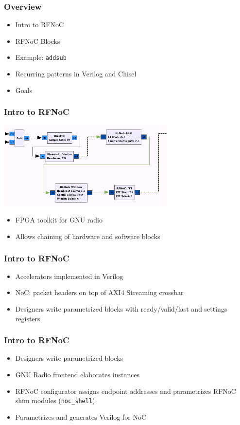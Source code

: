 \documentclass{beamer}
\author{Albert Magyar}
\date{\today}
\begin{document}
\begin{frame}
\titlepage
\end{frame}

\begin{frame}
\frametitle{Overview}
\begin{itemize}
\item Intro to RFNoC
\item RFNoC Blocks
\item Example: \texttt{addsub}
\item Recurring patterns in Verilog and Chisel
\item Goals
\end{itemize}
\end{frame}

\begin{frame}
\frametitle{Intro to RFNoC}
\begin{center}
\includegraphics[width=3.5in]{images/gnu_radio_rfnoc.png}
\end{center}
\begin{itemize}
\item FPGA toolkit for GNU radio
\item Allows chaining of hardware and software blocks 
\end{itemize}
\end{frame}

\begin{frame}
\frametitle{Intro to RFNoC}
\begin{itemize}
\item Accelerators implemented in Verilog
\item NoC: packet headers on top of AXI4 Streaming crossbar
\item Designers write parametrized blocks with ready/valid/last and settings registers
\end{itemize}
\end{frame}

\begin{frame}
\frametitle{Intro to RFNoC}
\begin{itemize}
\item Designers write parametrized blocks
\item GNU Radio frontend elaborates instances
\item RFNoC configurator assigns endpoint addresses and parametrizes RFNoC shim modules (\texttt{noc\_shell}) 
\item Parametrizes and generates Verilog for NoC
\end{itemize}
\end{frame}
\end{document}
